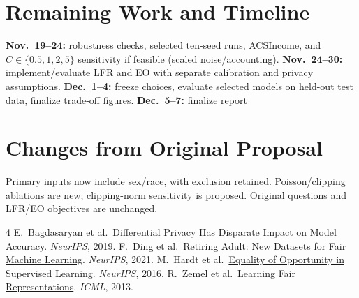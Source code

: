 \documentclass[11pt,letterpaper]{article}
\begin{document}
\section{Remaining Work and Timeline}
\textbf{Nov.\ 19--24:} robustness checks, selected ten-seed runs, ACSIncome, and
$C\in\{0.5,1,2,5\}$ sensitivity if feasible (scaled noise/accounting).
\textbf{Nov.\ 24--30:} implement/evaluate LFR and EO with separate calibration and privacy assumptions.
\textbf{Dec.\ 1--4:} freeze choices, evaluate selected models on held-out test data, finalize trade-off figures.
\textbf{Dec.\ 5--7:} finalize report

\section{Changes from Original Proposal}
Primary inputs now include sex/race, with exclusion retained. Poisson/clipping ablations are new;
clipping-norm sensitivity is proposed. Original questions and LFR/EO objectives are unchanged.

\renewcommand{\refname}{References}
\begin{thebibliography}{4}
\setlength{\itemsep}{0pt}\setlength{\parskip}{0pt}
 E.\ Bagdasaryan et al.\ \href{https://proceedings.neurips.cc/paper/2019/hash/fc0de4e0396fff257ea362983c2dda5a-Abstract.html}{Differential Privacy Has Disparate Impact on Model Accuracy}. \textit{NeurIPS}, 2019.
 F.\ Ding et al.\ \href{https://arxiv.org/abs/2108.04884}{Retiring Adult: New Datasets for Fair Machine Learning}. \textit{NeurIPS}, 2021.
 M.\ Hardt et al.\ \href{https://arxiv.org/abs/1610.02413}{Equality of Opportunity in Supervised Learning}. \textit{NeurIPS}, 2016.
 R.\ Zemel et al.\ \href{https://proceedings.mlr.press/v28/zemel13.html}{Learning Fair Representations}. \textit{ICML}, 2013.
\end{thebibliography}
\end{document}
